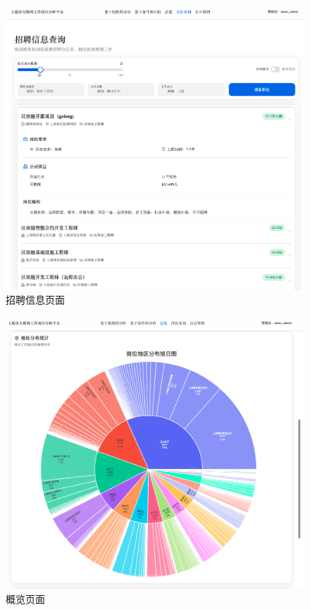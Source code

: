\begin{figure}[htbp]
    \centering
    \includegraphics[width=1.0\textwidth]{figures/recruitment_page.png}
    \caption{招聘信息页面}
    \label{fig:recruitment_page}
\end{figure}

\begin{figure}[htbp]
    \centering
    \includegraphics[width=1.0\textwidth]{figures/overview_page.png}
    \caption{概览页面}
    \label{fig:overview_page}
\end{figure}

